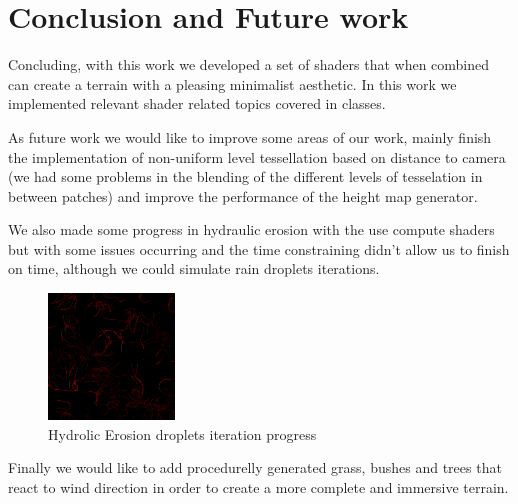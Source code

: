 \documentclass[a4paper]{report}
\begin{document}
\chapter{Conclusion and Future work}
Concluding, with this work we developed a set of shaders that when combined can create a terrain with a pleasing minimalist aesthetic. In this work we implemented relevant shader related topics covered in classes.

As future work we would like to improve some areas of our work, mainly finish the implementation of non-uniform level tessellation based on distance to camera (we had some problems in the blending of the different levels of tesselation in between patches) and improve the performance of the height map generator. 

We also made some progress in hydraulic erosion with the use compute shaders but with some issues occurring and the time constraining didn't allow us to finish on time, although we could simulate rain droplets iterations.

\begin{figure}[H]
  \centering
  \includegraphics[width=0.3\textwidth]{images/droplets.png}
  \caption{Hydrolic Erosion droplets iteration progress}
\end{figure}

Finally we would like to add procedurelly generated grass, bushes and trees that react to wind direction in order to create a more complete and immersive terrain.



\end{document}
